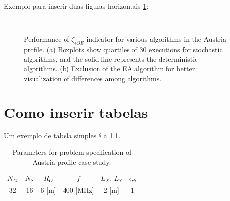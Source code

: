 		Exemplo para inserir duas figuras horizontais \ref{fig:results:casestudy:austria:boxplot:zeta_eoe}:
		\begin{figure}
			\centering
			 \\
			\caption[Performance of $\zeta_{\epsilon OE}$ indicator for various algorithms in the Austria profile.]{Performance of $\zeta_{\epsilon OE}$ indicator for various algorithms in the Austria profile. (a) Boxplots show quartiles of 30 executions for stochastic algorithms, and the solid line represents the deterministic algorithms. (b) Exclusion of the EA algorithm for better visualization of differences among algorithms.}
			\label{fig:results:casestudy:austria:boxplot:zeta_eoe}
		\end{figure}
	
	\chapter{Como inserir tabelas}

		\renewcommand{\arraystretch}{1.3}

		Um exemplo de tabela simples é a \ref{tab:results:casestudy:austria:configuration}.
		\begin{table}[!h]
			\centering
			\caption[Parameters for Austria profile case study.]{Parameters for problem specification of Austria profile case study.}
			\begin{tabular}{cccccc}
				$N_M$ & $N_S$ & $R_O$ & $f$ & $L_X$, $L_Y$ & $\epsilon_{rb}$ \\
				32 & 16 & 6 [m] & 400 [MHz] & 2 [m] & 1
			\end{tabular}
			\label{tab:results:casestudy:austria:configuration}
		\end{table}


